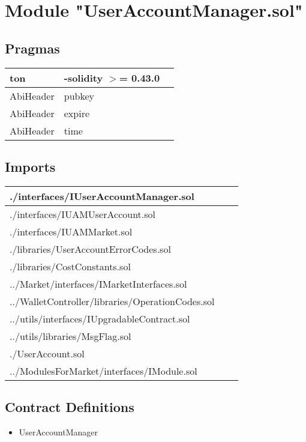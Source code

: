 
\section{Module "UserAccountManager.sol"}


\subsection{Pragmas}


\noindent\begin{tabular}{|l|l|p{5cm}|}\hline
ton & -solidity $>$= 0.43.0 &\\\hline
AbiHeader &  pubkey &\\\hline
AbiHeader &  expire &\\\hline
AbiHeader &  time &\\\hline
\end{tabular}


\subsection{Imports}


\noindent\begin{tabular}{|l|l|p{5cm}|}\hline
./interfaces/IUserAccountManager.sol &\\\hline
./interfaces/IUAMUserAccount.sol &\\\hline
./interfaces/IUAMMarket.sol &\\\hline
./libraries/UserAccountErrorCodes.sol &\\\hline
./libraries/CostConstants.sol &\\\hline
../Market/interfaces/IMarketInterfaces.sol &\\\hline
../WalletController/libraries/OperationCodes.sol &\\\hline
../utils/interfaces/IUpgradableContract.sol &\\\hline
../utils/libraries/MsgFlag.sol &\\\hline
./UserAccount.sol &\\\hline
../ModulesForMarket/interfaces/IModule.sol &\\\hline
\end{tabular}


\subsection{Contract Definitions}

\begin{itemize}
\item UserAccountManager
\end{itemize}
